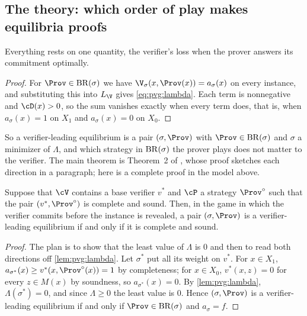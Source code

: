 \begin{refsection}
\section{The theory: which order of play makes equilibria proofs}\label{sec:pvg:theory}

Everything rests on one quantity, the verifier's loss when the prover answers its commitment optimally.


\begin{proof}
For $\Prov\in\pvgBR(\sigma)$ we have $\V_\sigma(x,\Prov(x))=a_\sigma(x)$ on every instance, and substituting this into $L_\V$ gives \eqref{eq:pvg:lambda}. Each term is nonnegative and $\cD(x)>0$, so the sum vanishes exactly when every term does, that is, when $a_\sigma(x)=1$ on $X_1$ and $a_\sigma(x)=0$ on $X_0$.
\end{proof}

So a verifier-leading equilibrium is a pair $(\sigma,\Prov)$ with $\Prov\in\pvgBR(\sigma)$ and $\sigma$ a minimizer of $\Lambda$, and which strategy in $\mathrm{BR}(\sigma)$ the prover plays does not matter to the verifier. The main theorem is Theorem~2 of \textcite{AnilEtAl2021}, whose proof sketches each direction in a paragraph; here is a complete proof in the model above.

\begin{theorem}\label{thm:pvg:stackelberg}
Suppose that $\cV$ contains a base verifier $v^*$ and $\cP$ a strategy $\Prov^\circ$ such that the pair $(v^*,\Prov^\circ)$ is complete and sound. Then, in the game in which the verifier commits before the instance is revealed, a pair $(\sigma,\Prov)$ is a verifier-leading equilibrium if and only if it is complete and sound.
\end{theorem}

\begin{proof}
The plan is to show that the least value of $\Lambda$ is $0$ and then to read both directions off \cref{lem:pvg:lambda}. Let $\sigma^*$ put all its weight on $v^*$. For $x\in X_1$, $a_{\sigma^*}(x)\ge v^*(x,\Prov^\circ(x))=1$ by completeness; for $x\in X_0$, $v^*(x,z)=0$ for every $z\in M(x)$ by soundness, so $a_{\sigma^*}(x)=0$. By \cref{lem:pvg:lambda}, $\Lambda(\sigma^*)=0$, and since $\Lambda\ge0$ the least value is $0$. Hence $(\sigma,\Prov)$ is a verifier-leading equilibrium if and only if $\Prov\in\pvgBR(\sigma)$ and $a_\sigma=f$.


\end{proof}
\end{refsection}
